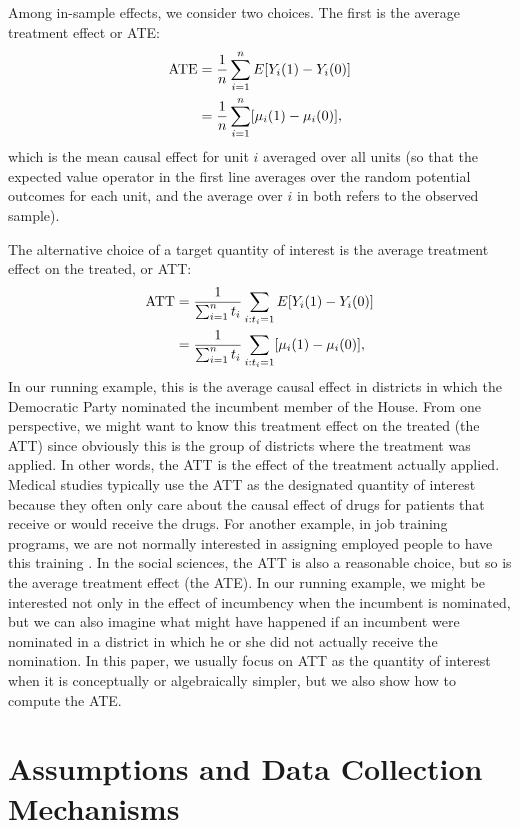\documentclass[11pt,titlepage]{article}
\begin{document}
Among in-sample effects, we consider two choices.  The first is the
average treatment effect or ATE:
\begin{align}
  \label{pate}
  \text{ATE} & = \frac{1}{n}\sum_{i=1}^n E[Y_i(1) - Y_i(0)] \notag\\
  &  = \frac{1}{n}\sum_{i=1}^n[\mu_i(1) - \mu_i(0)],
\end{align}
which is the mean causal effect for unit $i$ averaged over all units
(so that the expected value operator in the first line averages over
the random potential outcomes for each unit, and the average over $i$
in both refers to the observed sample).

The alternative choice of a target quantity of interest is the average
treatment effect on the treated, or ATT:
\begin{align}
  \label{att}
  \text{ATT} & = \frac{1}{\sum_{i=1}^n t_i}\sum_{i:t_i=1} E[Y_i(1) - Y_i(0)]\notag\\
  & = \frac{1}{\sum_{i=1}^n t_i}\sum_{i:t_i=1}[\mu_i(1) - \mu_i(0)],
\end{align}
In our running example, this is the average causal effect in districts
in which the Democratic Party nominated the incumbent member of the
House.  From one perspective, we might want to know this treatment
effect on the treated (the ATT) since obviously this is the group of
districts where the treatment was applied.  In other words, the ATT is
the effect of the treatment actually applied.  Medical studies
typically use the ATT as the designated quantity of interest because
they often only care about the causal effect of drugs for patients
that receive or would receive the drugs.  For another example, in job
training programs, we are not normally interested in assigning
employed people to have this training \citep{HecIchTod98}.  In the
social sciences, the ATT is also a reasonable choice, but so is the
average treatment effect (the ATE).  In our running example, we might
be interested not only in the effect of incumbency when the incumbent
is nominated, but we can also imagine what might have happened if an
incumbent were nominated in a district in which he or she did not
actually receive the nomination.  In this paper, we usually focus on
ATT as the quantity of interest when it is conceptually or
algebraically simpler, but we also show how to compute the ATE.

\section{Assumptions and Data Collection Mechanisms}
\end{document}
